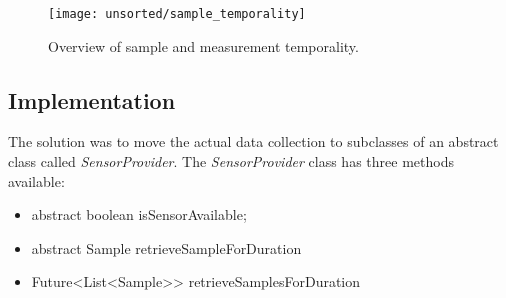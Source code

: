 \begin{figure}[!htbp]
    \centering
    \texttt{[image: unsorted/sample\_temporality]}
    \caption{Overview of sample and measurement temporality.}
    \label{fig:sample_temporality}
\end{figure}
\FloatBarrier

\subsection{Implementation}

The solution was to move the actual data collection to subclasses of an abstract class called \emph{SensorProvider}. The \emph{SensorProvider} class has three methods available: 
\begin{itemize}
	\item abstract boolean isSensorAvailable;
	\item abstract Sample retrieveSampleForDuration
	\item Future<List<Sample>> retrieveSamplesForDuration
\end{itemize}

